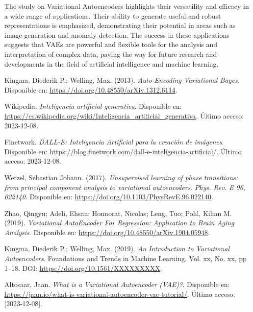 \documentclass[twocolumn, 9pt]{article}
\begin{document}
The study on Variational Autoencoders highlights their versatility and efficacy in a wide range of applications. Their ability to generate useful and robust representations is emphasized, demonstrating their potential in areas such as image generation and anomaly detection. The success in these applications suggests that VAEs are powerful and flexible tools for the analysis and interpretation of complex data, paving the way for future research and developments in the field of artificial intelligence and machine learning.

\begin{thebibliography}{1}

 Kingma, Diederik P.; Welling, Max. (2013). \textit{Auto-Encoding Variational Bayes}. Disponible en: \url{https://doi.org/10.48550/arXiv.1312.6114}.

 Wikipedia. \textit{Inteligencia artificial generativa}. Disponible en: \url{https://es.wikipedia.org/wiki/Inteligencia_artificial_generativa}. Último acceso: 2023-12-08.

 Finetwork. \textit{DALL-E: Inteligencia Artificial para la creación de imágenes}. Disponible en: \url{https://blog.finetwork.com/dall-e-inteligencia-artificial/}. Último acceso: 2023-12-08.

 Wetzel, Sebastian Johann. (2017). \textit{Unsupervised learning of phase transitions: from principal component analysis to variational autoencoders}. \textit{Phys. Rev. E 96, 022140}. Disponible en: \url{https://doi.org/10.1103/PhysRevE.96.022140}.

 Zhao, Qingyu; Adeli, Ehsan; Honnorat, Nicolas; Leng, Tuo; Pohl, Kilian M. (2019). \textit{Variational AutoEncoder For Regression: Application to Brain Aging Analysis}. Disponible en: \url{https://doi.org/10.48550/arXiv.1904.05948}.

 Kingma, Diederik P.; Welling, Max. (2019). \textit{An Introduction to Variational Autoencoders}. Foundations and Trends in Machine Learning. Vol. xx, No. xx, pp 1--18. DOI: \url{https://doi.org/10.1561/XXXXXXXXX}.

 Altosaar, Jaan. \textit{What is a Variational Autoencoder (VAE)?}. Disponible en: \url{https://jaan.io/what-is-variational-autoencoder-vae-tutorial/}. Último acceso: [2023-12-08].


\end{thebibliography}
\end{document}
